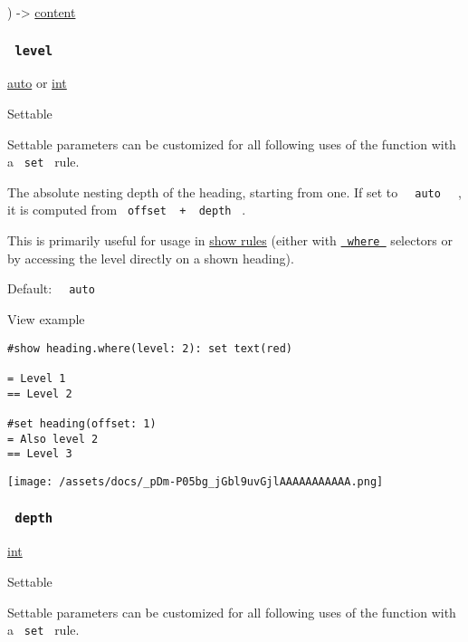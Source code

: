 ) -\textgreater{} \href{/docs/reference/foundations/content/}{content}

\subsubsection{\texorpdfstring{\texttt{\ level\ }}{ level }}\label{parameters-level}

\href{/docs/reference/foundations/auto/}{auto} {or}
\href{/docs/reference/foundations/int/}{int}

{{ Settable }}

\label{parameters-level-settable-tooltip}
Settable parameters can be customized for all following uses of the
function with a \texttt{\ set\ } rule.

The absolute nesting depth of the heading, starting from one. If set to
\texttt{\ }{\texttt{\ auto\ }}\texttt{\ } , it is computed from
\texttt{\ offset\ }{\texttt{\ +\ }}\texttt{\ depth\ } .

This is primarily useful for usage in
\href{/docs/reference/styling/\#show-rules}{show rules} (either with
\href{/docs/reference/foundations/function/\#definitions-where}{\texttt{\ where\ }}
selectors or by accessing the level directly on a shown heading).

Default: \texttt{\ }{\texttt{\ auto\ }}\texttt{\ }


View example

\begin{verbatim}
#show heading.where(level: 2): set text(red)

= Level 1
== Level 2

#set heading(offset: 1)
= Also level 2
== Level 3
\end{verbatim}

\texttt{[image: /assets/docs/\_pDm-P05bg\_jGbl9uvGjlAAAAAAAAAAA.png]}

\subsubsection{\texorpdfstring{\texttt{\ depth\ }}{ depth }}\label{parameters-depth}

\href{/docs/reference/foundations/int/}{int}

{{ Settable }}

\label{parameters-depth-settable-tooltip}
Settable parameters can be customized for all following uses of the
function with a \texttt{\ set\ } rule.

